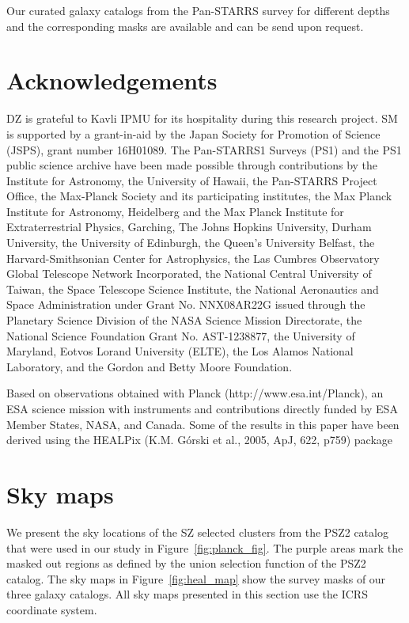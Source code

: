 \documentclass[iop, apjl, twocolappendix, numberedappendix]{emulateapj}
\begin{document}
Our curated galaxy catalogs from the Pan-STARRS survey for different
depths and the corresponding masks are available and can be send
upon request.

\section*{Acknowledgements}
DZ is grateful to Kavli IPMU for its hospitality during this
research project. SM is supported by a grant-in-aid by the Japan
Society for Promotion of Science (JSPS), grant number 16H01089.
The Pan-STARRS1 Surveys (PS1) and the PS1 public science archive
have been made possible through contributions by the Institute for
Astronomy, the University of Hawaii, the Pan-STARRS Project Office,
the Max-Planck Society and its participating institutes, the Max
Planck Institute for Astronomy, Heidelberg and the Max Planck
Institute for Extraterrestrial Physics, Garching, The Johns Hopkins
University, Durham University, the University of Edinburgh, the
Queen's University Belfast, the Harvard-Smithsonian Center for
Astrophysics, the Las Cumbres Observatory Global Telescope Network
Incorporated, the National Central University of Taiwan, the Space
Telescope Science Institute, the National Aeronautics and Space
Administration under Grant No. NNX08AR22G issued through the
Planetary Science Division of the NASA Science Mission Directorate,
the National Science Foundation Grant No. AST-1238877, the
University of Maryland, Eotvos Lorand University (ELTE), the Los
Alamos National Laboratory, and the Gordon and Betty Moore
Foundation.

Based on observations obtained with Planck
(http://www.esa.int/Planck), an ESA science mission with instruments
and contributions directly funded by ESA Member States, NASA, and
Canada.  Some of the results in this paper have been derived using
the HEALPix (K.M. Górski et al., 2005, ApJ, 622, p759) package


 



\appendix

\section{Sky maps}
\label{sec:figures}
We present the sky locations of the SZ selected clusters from the PSZ2
catalog that were used in our study in Figure~\ref{fig:planck_fig}.
The purple areas mark the masked out regions as defined by the union
selection function of the PSZ2 catalog. The sky maps in
Figure~\ref{fig:heal_map} show the survey masks of our three galaxy
catalogs. All sky maps presented in this section use the ICRS
coordinate system.
\end{document}
